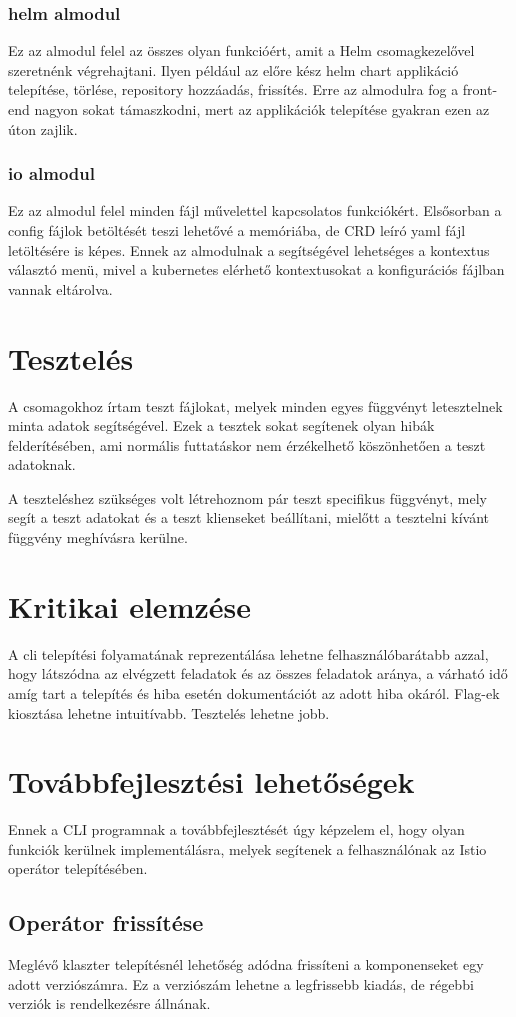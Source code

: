 \subsubsection*{helm almodul}
Ez az almodul felel az összes olyan funkcióért, amit a Helm csomagkezelővel szeretnénk végrehajtani. Ilyen például az előre kész helm chart applikáció telepítése, törlése, repository hozzáadás, frissítés. Erre az almodulra fog a front-end nagyon sokat támaszkodni, mert az applikációk telepítése gyakran ezen az úton zajlik.
\subsubsection*{io almodul}
Ez az almodul felel minden fájl művelettel kapcsolatos funkciókért. Elsősorban a config fájlok betöltését teszi lehetővé a memóriába, de CRD leíró yaml fájl letöltésére is képes. Ennek az almodulnak a segítségével lehetséges a kontextus választó menü, mivel a kubernetes elérhető kontextusokat a konfigurációs fájlban vannak eltárolva.
\section{Tesztelés}
A csomagokhoz írtam teszt fájlokat, melyek minden egyes függvényt letesztelnek minta adatok segítségével. Ezek a tesztek sokat segítenek olyan hibák felderítésében, ami normális futtatáskor nem érzékelhető köszönhetően a teszt adatoknak.

A teszteléshez szükséges volt létrehoznom pár teszt specifikus függvényt, mely segít a teszt adatokat és a teszt klienseket beállítani, mielőtt a tesztelni kívánt függvény meghívásra kerülne.

\section{Kritikai elemzése}
A cli telepítési folyamatának reprezentálása lehetne felhasználóbarátabb azzal, hogy látszódna az elvégzett feladatok és az összes feladatok aránya, a várható idő amíg tart a telepítés és hiba esetén dokumentációt az adott hiba okáról.
Flag-ek kiosztása lehetne intuitívabb.
Tesztelés lehetne jobb.
\section{Továbbfejlesztési lehetőségek}
Ennek a CLI programnak a továbbfejlesztését úgy képzelem el, hogy olyan funkciók kerülnek implementálásra, melyek segítenek a felhasználónak az Istio operátor telepítésében.
\subsection{Operátor frissítése}
Meglévő klaszter telepítésnél lehetőség adódna frissíteni a komponenseket egy adott verziószámra. Ez a verziószám lehetne a legfrissebb kiadás, de régebbi verziók is rendelkezésre állnának.
